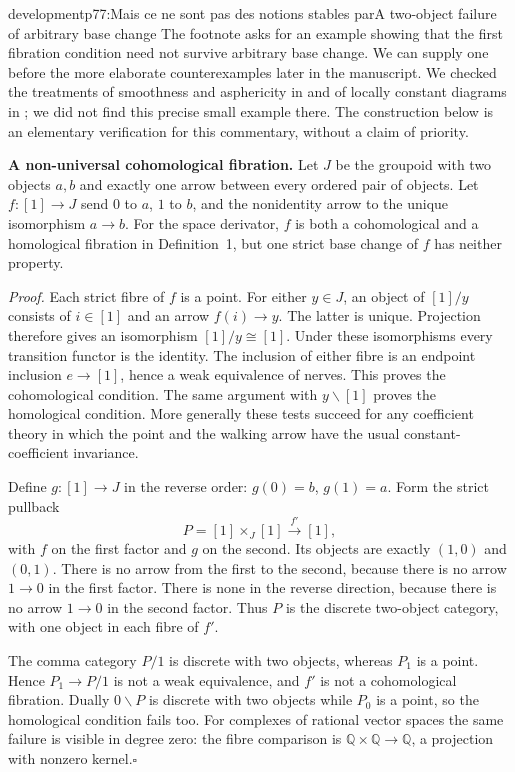 \begin{dcomment}{development}{p77:Mais ce ne sont pas des notions stables par}{A two-object failure of arbitrary base change}
The footnote asks for an example showing that the first fibration condition need not survive arbitrary base change. We can supply one before the more elaborate counterexamples later in the manuscript. We checked the treatments of smoothness and asphericity in \citet[Sections~1 and~4]{Maltsiniotis2005Asphericite} and of locally constant diagrams in \citet{Cisinski2009LocallyConstant}; we did not find this precise small example there. The construction below is an elementary verification for this commentary, without a claim of priority.

\textbf{A non-universal cohomological fibration.}\ours
Let $J$ be the groupoid with two objects $a,b$ and exactly one arrow between every ordered pair of objects. Let $f:[1]\to J$ send $0$ to $a$, $1$ to $b$, and the nonidentity arrow to the unique isomorphism $a\to b$. For the space derivator, $f$ is both a cohomological and a homological fibration in Definition~1, but one strict base change of $f$ has neither property.

\emph{Proof.} Each strict fibre of $f$ is a point. For either $y\in J$, an object of $[1]/y$ consists of $i\in[1]$ and an arrow $f(i)\to y$. The latter is unique. Projection therefore gives an isomorphism $[1]/y\cong[1]$. Under these isomorphisms every transition functor is the identity. The inclusion of either fibre is an endpoint inclusion $e\to[1]$, hence a weak equivalence of nerves. This proves the cohomological condition. The same argument with $y\backslash[1]$ proves the homological condition. More generally these tests succeed for any coefficient theory in which the point and the walking arrow have the usual constant-coefficient invariance.

Define $g:[1]\to J$ in the reverse order: $g(0)=b$, $g(1)=a$. Form the strict pullback
\[
 P=[1]\times_J[1]\xrightarrow{\,f'\,}[1],
\]
with $f$ on the first factor and $g$ on the second. Its objects are exactly $(1,0)$ and $(0,1)$. There is no arrow from the first to the second, because there is no arrow $1\to0$ in the first factor. There is none in the reverse direction, because there is no arrow $1\to0$ in the second factor. Thus $P$ is the discrete two-object category, with one object in each fibre of $f'$.

The comma category $P/1$ is discrete with two objects, whereas $P_1$ is a point. Hence $P_1\to P/1$ is not a weak equivalence, and $f'$ is not a cohomological fibration. Dually $0\backslash P$ is discrete with two objects while $P_0$ is a point, so the homological condition fails too. For complexes of rational vector spaces the same failure is visible in degree zero: the fibre comparison is $\mathbb Q\times\mathbb Q\to\mathbb Q$, a projection with nonzero kernel.\hfill$\square$


\end{dcomment}
